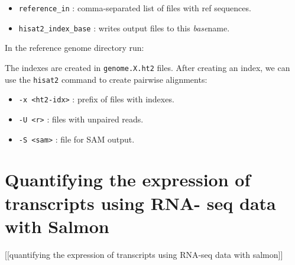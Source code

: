 \begin{itemize}
\tightlist
\item
  \texttt{reference\_in} : comma-separated list of files with ref
  sequences.
\item
  \texttt{hisat2\_index\_base} : writes output files to this
  \emph{base}name.
\end{itemize}

In the reference genome directory run:

\begin{Shaded}
\begin{Highlighting}[]
 \DataTypeTok{\textbackslash{}}
\DataTypeTok{\textbackslash{}}
\end{Highlighting}
\end{Shaded}

The indexes are created in \texttt{genome.X.ht2} files. After creating
an index, we can use the \texttt{hisat2} command to create pairwise
alignments:

\begin{Shaded}
\begin{Highlighting}[]
 
\end{Highlighting}
\end{Shaded}

\begin{itemize}
\tightlist
\item
  \texttt{-x\ \textless{}ht2-idx\textgreater{}} : prefix of files with
  indexes.
\item
  \texttt{-U\ \textless{}r\textgreater{}} : files with unpaired reads.
\item
  \texttt{-S\ \textless{}sam\textgreater{}} : file for SAM output.
\end{itemize}

\hypertarget{quantifying-the-expression-of-transcripts-using-rna--seq-data-with-salmon}{%
\section{Quantifying the expression of transcripts using RNA- seq data
with
Salmon}\label{quantifying-the-expression-of-transcripts-using-rna--seq-data-with-salmon}}

{[}{[}quantifying the expression of transcripts using RNA-seq data with
salmon{]}{]}



